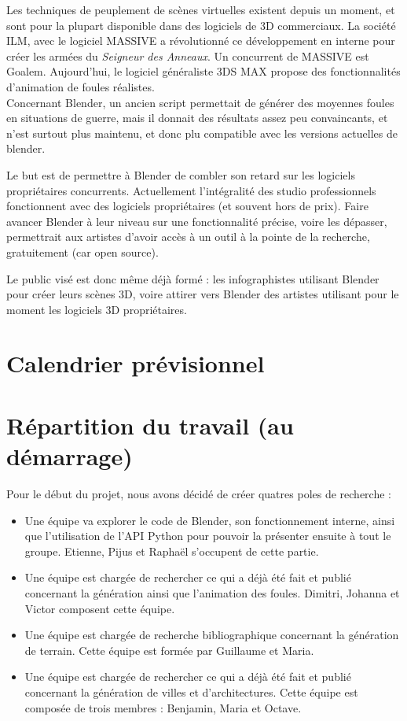 \documentclass[a4paper,12pt]{article}
\begin{document}
Les techniques de peuplement de scènes virtuelles existent depuis un moment, et sont pour la plupart disponible dans des logiciels de 3D commerciaux. La société ILM, avec le logiciel MASSIVE\cite{Massive} a révolutionné ce développement en interne pour créer les armées du \textit{Seigneur des Anneaux}. Un concurrent de MASSIVE est Goalem\cite{Goalem}. Aujourd'hui, le logiciel généraliste 3DS MAX\cite{3dsmax} propose des fonctionnalités d'animation de foules réalistes. \\
Concernant Blender, un ancien script permettait de générer des moyennes foules en situations de guerre, mais il donnait des résultats assez peu convaincants, et n'est surtout plus maintenu, et donc plu compatible avec les versions actuelles de blender.

Le but est de permettre à Blender de combler son retard sur les logiciels propriétaires concurrents. Actuellement l'intégralité des studio professionnels fonctionnent avec des logiciels propriétaires (et souvent hors de prix). Faire avancer Blender à leur niveau sur une fonctionnalité précise, voire les dépasser, permettrait aux artistes d'avoir accès à un outil à la pointe de la recherche, gratuitement (car open source).

Le public visé est donc même déjà formé : les infographistes utilisant Blender pour créer leurs scènes 3D, voire attirer vers Blender des artistes utilisant pour le moment les logiciels 3D propriétaires.

\section{Calendrier prévisionnel}

\section{Répartition du travail (au démarrage)}

Pour le début du projet, nous avons décidé de créer quatres poles de recherche :
\begin{itemize}
\item Une équipe va explorer le code de Blender, son fonctionnement interne, ainsi que l'utilisation de l'API Python pour pouvoir la présenter ensuite à tout le groupe. Etienne, Pijus et Raphaël s'occupent de cette partie. 
\item Une équipe est chargée de rechercher ce qui a déjà été fait et publié concernant la génération ainsi que l'animation des foules. Dimitri, Johanna et Victor composent cette équipe.
\item Une équipe est chargée de recherche bibliographique concernant la génération de terrain. Cette équipe est formée par Guillaume et Maria.
\item Une équipe est chargée de rechercher ce qui a déjà été fait et publié concernant la génération de villes et d'architectures. Cette équipe est composée de trois membres : Benjamin, Maria et Octave.
\end{itemize}
\end{document}
